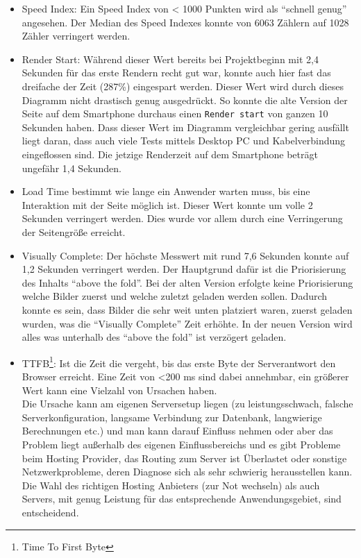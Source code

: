     \begin{itemize}
      \item Speed Index: Ein Speed Index von < 1000 Punkten wird als "`schnell genug"' angesehen. Der Median des Speed Indexes konnte von 6063 Zählern auf 1028 Zähler verringert werden.

      \item Render Start: Während dieser Wert bereits bei Projektbeginn mit 2,4 Sekunden für das erste Rendern recht gut war, konnte auch hier fast das dreifache der Zeit (287\%) eingespart werden. Dieser Wert wird durch dieses Diagramm nicht drastisch genug ausgedrückt. So konnte die alte Version der Seite auf dem Smartphone durchaus einen \texttt{Render start} von ganzen 10 Sekunden haben. Dass dieser Wert im Diagramm vergleichbar gering ausfällt liegt daran, dass auch viele Tests mittels Desktop PC und Kabelverbindung eingeflossen sind. Die jetzige Renderzeit auf dem Smartphone beträgt ungefähr 1,4 Sekunden.

      \item Load Time bestimmt wie lange ein Anwender warten muss, bis eine Interaktion mit der Seite möglich ist. Dieser Wert konnte um volle 2 Sekunden verringert werden. Dies wurde vor allem durch eine Verringerung der Seitengröße erreicht.

      \item Visually Complete: Der höchste Messwert mit rund 7,6 Sekunden konnte auf 1,2 Sekunden verringert werden. Der Hauptgrund dafür ist die Priorisierung des Inhalts "`above the fold"'. Bei der alten Version erfolgte keine Priorisierung welche Bilder zuerst und welche zuletzt geladen werden sollen. Dadurch konnte es sein, dass Bilder die sehr weit unten platziert waren, zuerst geladen wurden, was die "`Visually Complete"' Zeit erhöhte. In der neuen Version wird alles was unterhalb des "`above the fold"' ist verzögert geladen.

      \item TTFB\footnote{Time To First Byte}: Ist die Zeit die vergeht, bis das erste Byte der Serverantwort den Browser erreicht. Eine Zeit von <200 ms sind dabei annehmbar, ein größerer Wert kann eine Vielzahl von Ursachen haben.\\
      Die Ursache kann am eigenen Serversetup liegen (zu leistungsschwach, falsche Serverkonfiguration, langsame Verbindung zur Datenbank, langwierige Berechnungen etc.) und man kann darauf Einfluss nehmen oder aber das Problem liegt außerhalb des eigenen Einflussbereichs und es gibt Probleme beim Hosting Provider, das Routing zum Server ist Überlastet oder sonstige Netzwerkprobleme, deren Diagnose sich als sehr schwierig herausstellen kann.
      Die Wahl des richtigen Hosting Anbieters (zur Not wechseln) als auch Servers, mit genug Leistung für das entsprechende Anwendungsgebiet, sind entscheidend.
    \end{itemize}

